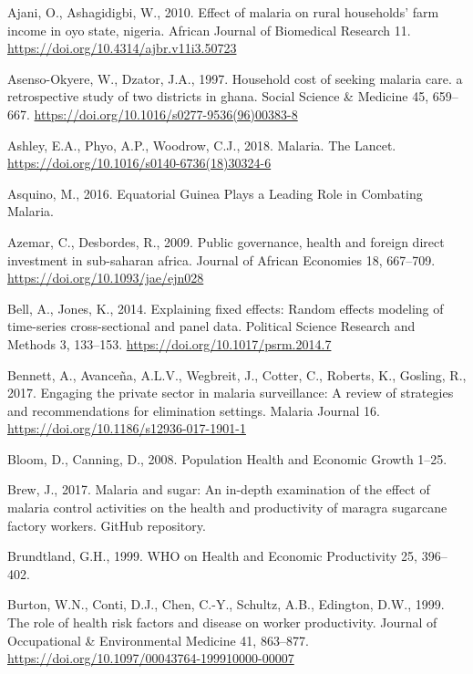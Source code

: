 \documentclass[]{article}
\begin{document}
\hypertarget{refs}{}
\hypertarget{ref-Ajani2010}{}
Ajani, O., Ashagidigbi, W., 2010. Effect of malaria on rural households'
farm income in oyo state, nigeria. African Journal of Biomedical
Research 11. \url{https://doi.org/10.4314/ajbr.v11i3.50723}

\hypertarget{ref-AsensoOkyere1997}{}
Asenso-Okyere, W., Dzator, J.A., 1997. Household cost of seeking malaria
care. a retrospective study of two districts in ghana. Social Science \&
Medicine 45, 659--667.
\url{https://doi.org/10.1016/s0277-9536(96)00383-8}

\hypertarget{ref-Ashley2018}{}
Ashley, E.A., Phyo, A.P., Woodrow, C.J., 2018. Malaria. The Lancet.
\url{https://doi.org/10.1016/s0140-6736(18)30324-6}

\hypertarget{ref-asquino2015}{}
Asquino, M., 2016. Equatorial Guinea Plays a Leading Role in Combating
Malaria.

\hypertarget{ref-Azemar2009}{}
Azemar, C., Desbordes, R., 2009. Public governance, health and foreign
direct investment in sub-saharan africa. Journal of African Economies
18, 667--709. \url{https://doi.org/10.1093/jae/ejn028}

\hypertarget{ref-Bell2014}{}
Bell, A., Jones, K., 2014. Explaining fixed effects: Random effects
modeling of time-series cross-sectional and panel data. Political
Science Research and Methods 3, 133--153.
\url{https://doi.org/10.1017/psrm.2014.7}

\hypertarget{ref-Bennett_2017}{}
Bennett, A., Avanceña, A.L.V., Wegbreit, J., Cotter, C., Roberts, K.,
Gosling, R., 2017. Engaging the private sector in malaria surveillance:
A review of strategies and recommendations for elimination settings.
Malaria Journal 16. \url{https://doi.org/10.1186/s12936-017-1901-1}

\hypertarget{ref-Bloom2008}{}
Bloom, D., Canning, D., 2008. Population Health and Economic Growth
1--25.

\hypertarget{ref-brewgit}{}
Brew, J., 2017. Malaria and sugar: An in-depth examination of the effect
of malaria control activities on the health and productivity of maragra
sugarcane factory workers. GitHub repository.

\hypertarget{ref-World1999}{}
Brundtland, G.H., 1999. WHO on Health and Economic Productivity 25,
396--402.

\hypertarget{ref-Burton1999}{}
Burton, W.N., Conti, D.J., Chen, C.-Y., Schultz, A.B., Edington, D.W.,
1999. The role of health risk factors and disease on worker
productivity. Journal of Occupational \& Environmental Medicine 41,
863--877. \url{https://doi.org/10.1097/00043764-199910000-00007}
\end{document}
